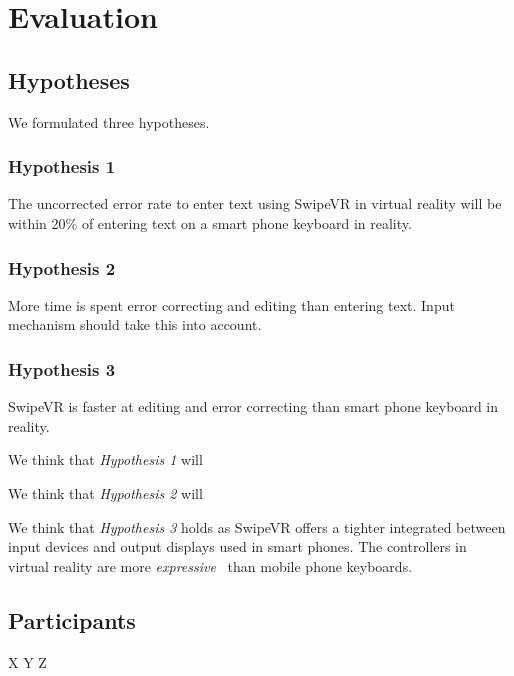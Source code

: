 \section{Evaluation}


\subsection{Hypotheses}
We formulated three hypotheses.

\subsubsection{Hypothesis 1}
The uncorrected error rate to enter text using SwipeVR in virtual reality will be within 20\% of entering text on a smart phone keyboard in reality.

\subsubsection{Hypothesis 2}
More time is spent error correcting and editing than entering text.  Input mechanism should take this into account.

\subsubsection{Hypothesis 3}
SwipeVR is faster at editing and error correcting than smart phone keyboard in reality.


We think that \textit{Hypothesis 1} will

We think that \textit{Hypothesis 2} will

We think that \textit{Hypothesis 3} holds as SwipeVR offers a tighter integrated between input devices and output displays used in smart phones.
The controllers in virtual reality are more \textit{expressive}~\cite{card1990design} than mobile phone keyboards.

\subsection{Participants}
X Y Z

